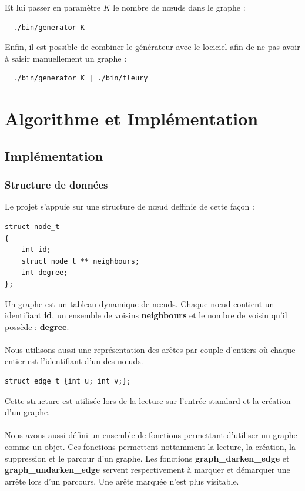 \documentclass[12pt,a4paper,utf8x]{report}
\begin{document}
  Et lui passer en paramètre $K$ le nombre de nœuds dans le graphe : 

  \begin{lstlisting}
  ./bin/generator K
  \end{lstlisting}

  Enfin, il est possible de combiner le générateur avec le lociciel afin de ne pas avoir à saisir manuellement un graphe : 

  \begin{lstlisting}
  ./bin/generator K | ./bin/fleury
  \end{lstlisting}


\chapter{Algorithme et Implémentation}
  \section{Implémentation}
    \subsection{Structure de données}
    Le projet s'appuie sur une structure de nœud deffinie de cette façon : 
    \begin{lstlisting}
struct node_t
{
    int id;
    struct node_t ** neighbours;
    int degree;
};
    \end{lstlisting} 
    Un graphe est un tableau dynamique de nœuds. Chaque nœud contient un identifiant \textbf{id}, un ensemble de voisins \textbf{neighbours} et le nombre de voisin qu'il possède : \textbf{degree}.\\ \\
    \indent Nous utilisons aussi une représentation des arêtes par couple d'entiers où chaque entier est l'identifiant d'un des nœuds.
    \begin{lstlisting}
struct edge_t {int u; int v;};
    \end{lstlisting}
    Cette structure est utilisée lors de la lecture sur l'entrée standard et la création d'un graphe. \\ \\
    \indent Nous avons aussi défini un ensemble de fonctions permettant d'utiliser un graphe comme un objet. Ces fonctions permettent nottamment la lecture, la création, la suppression et le parcour d'un graphe. Les fonctions \textbf{graph\_darken\_edge} et \textbf{graph\_undarken\_edge} servent respectivement à marquer et démarquer une arrête lors d'un parcours. Une arête marquée n'est plus visitable.
\end{document}
